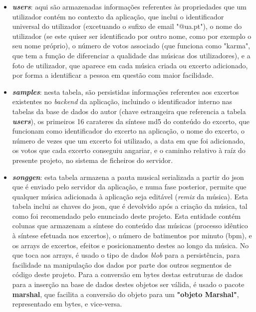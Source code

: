 \documentclass{report}
\begin{document}
\begin{itemize}
\item \textbf{\textit{users}}: aqui são armazenadas informações referentes às propriedades que um utilizador contém no contexto da aplicação, que inclui o identificador universal do utilizador (excetuando o sufixo de email "@ua.pt"), o nome do utilizador (se este quiser ser identificado por outro nome, como por exemplo o seu nome próprio), o número de votos associado (que funciona como "karma", que tem a função de diferenciar a qualidade das músicas dos utilizadores), e a foto de utilizador, que aparece em cada música criada ou excerto adicionado, por forma a identificar a pessoa em questão com maior facilidade.

\item \textbf{\textit{samples}}: nesta tabela, são persistidas informações referentes aos excertos existentes no \textit{backend} da aplicação, incluindo o identificador interno nas tabelas da base de dados do autor (chave estrangeira que referencia a tabela \textbf{\textit{users}}), os primeiros 16 carateres da síntese \ac{md5} do conteúdo do excerto, que funcionam como identificador do excerto na aplicação, o nome do excerto, o número de vezes que um excerto foi utilizado, a data em que foi adicionado, os votos que cada excerto conseguiu angariar, e o caminho relativo à raíz do presente projeto, no sistema de ficheiros do servidor.

\item \textbf{\textit{songgen}}: esta tabela armazena a pauta musical serializada a partir do \ac{json} que é enviado pelo servidor da aplicação, e numa fase posterior, permite que qualquer música adicionada à aplicação seja editável (\textit{remix} da música). Esta tabela inclui as chaves do \ac{json}, que é devolvido após a criação da música, tal como foi recomendado pelo enunciado deste projeto. Esta entidade contém colunas que armazenam a síntese do conteúdo das músicas (processo idêntico à síntese efetuada nos excertos), o número de batimentos por minuto (\ac{bpm}), e os arrays de excertos, efeitos e posicionamento destes ao longo da música. No que toca aos arrays, é usado o tipo de dados \textit{blob} para a persistência, para facilidade na manipulação dos dados por parte dos outros segmentos de código deste projeto. Para a conversão em bytes destas estruturas de dados para a inserção na base de dados destes objetos ser válida, é usado o pacote \textbf{marshal}, que facilita a conversão do objeto para um \textbf{"objeto Marshal"}, representado em bytes, e vice-versa.


\end{itemize}
\end{document}
